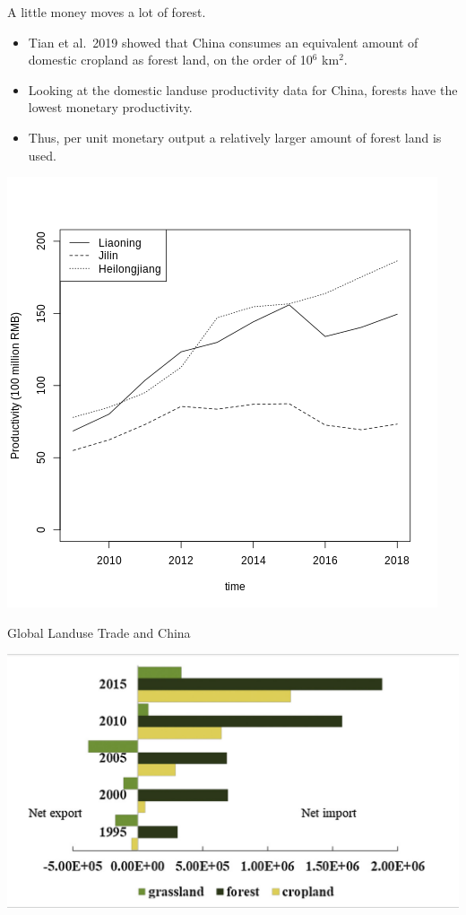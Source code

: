 \documentclass[ignorenonframetext,]{beamer}
\providecommand{\tightlist}{%
  \setlength{\itemsep}{0pt}\setlength{\parskip}{0pt}}
\begin{document}
\begin{frame}{A little money moves a lot of forest.}
\protect\hypertarget{a-little-money-moves-a-lot-of-forest.-1}{}

\begin{itemize}
\tightlist
\item
  Tian et al.~2019 showed that China consumes an equivalent amount of
  domestic cropland as forest land, on the order of 10\(^6\) km\(^2\).
\item
  Looking at the domestic landuse productivity data for China, forests
  have the lowest monetary productivity.
\item
  Thus, per unit monetary output a relatively larger amount of forest
  land is used.
\end{itemize}

\begin{center}\includegraphics[width=0.5\linewidth]{images/prod_for_time_nec} \end{center}

\end{frame}

\begin{frame}{Global Landuse Trade and China}
\protect\hypertarget{global-landuse-trade-and-china}{}

\begin{center}\includegraphics[width=0.5\linewidth]{images/Tian_2019_Fig2} \end{center}

\end{frame}
\end{document}
